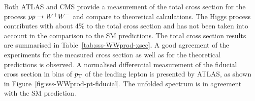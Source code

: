 
Both ATLAS and CMS provide a measurement of the total cross section for the process $pp \rightarrow W^+W^-$
and compare to theoretical calculations. The Higgs process contributes with about 4\% to the total 
cross section and has not been taken into account in the comparison to the SM predictions.
The total cross section results are summarised in Table~\ref{tab:sss-WWprod-xsec}.
A good agreement of the experiments for the measured cross section as well as for the theoretical predictions
is observed.
A normalised differential measurement of the fiducial cross section in bins of $p_{\mathrm{T}}$ of the leading lepton is presented by ATLAS,
as shown in Figure~\ref{fig:sss-WWprod-pt-fiducial}. The unfolded spectrum is in agreement with the SM prediction.

\begin{table}[htp]

\begin{center}
\caption{Summary of measured fiducial and total $\WW$ production cross sections from ATLAS and CMS 
at 7 and 8 TeV center-of-mass energies in the $\lnu\lnu$ final state.}
\end{center}
\label{tab:sss-WWprod-xsec}
\end{table}%

